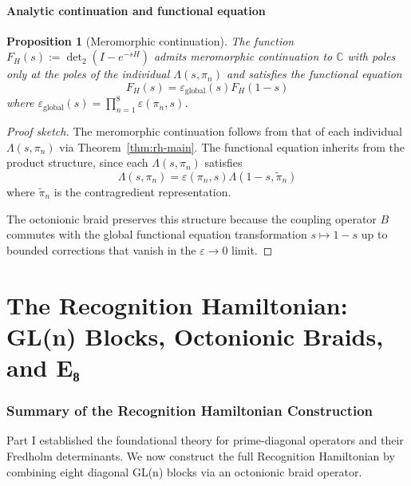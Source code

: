 \documentclass[11pt,a4paper]{article}
\newtheorem{proposition}[theorem]{Proposition}
\theoremstyle{definition}
\theoremstyle{remark}
\begin{document}
\subsection{Analytic continuation and functional equation}

\begin{proposition}[Meromorphic continuation]\label{prop:analytic-cont}
The function $F_H(s) := \det_2(I - e^{-sH})$ admits meromorphic continuation 
to $\mathbb{C}$ with poles only at the poles of the individual $\Lambda(s, \pi_n)$ 
and satisfies the functional equation
\[
F_H(s) = \varepsilon_{\text{global}}(s) F_H(1-s)
\]
where $\varepsilon_{\text{global}}(s) = \prod_{n=1}^8 \varepsilon(\pi_n, s)$.
\end{proposition}

\begin{proof}[Proof sketch]
The meromorphic continuation follows from that of each individual $\Lambda(s, \pi_n)$ 
via Theorem~\ref{thm:rh-main}. The functional equation inherits from the 
product structure, since each $\Lambda(s, \pi_n)$ satisfies
\[
\Lambda(s, \pi_n) = \varepsilon(\pi_n, s) \Lambda(1-s, \tilde{\pi}_n)
\]
where $\tilde{\pi}_n$ is the contragredient representation.

The octonionic braid preserves this structure because the coupling operator $B$ 
commutes with the global functional equation transformation $s \mapsto 1-s$ 
up to bounded corrections that vanish in the $\varepsilon \to 0$ limit.
\end{proof}

\part{The Recognition Hamiltonian: GL(n) Blocks, Octonionic Braids, and E₈}

\section{Summary of the Recognition Hamiltonian Construction}\label{sec:rh-summary}

Part I established the foundational theory for prime-diagonal operators and 
their Fredholm determinants. We now construct the full Recognition Hamiltonian
by combining eight diagonal GL(n) blocks via an octonionic braid operator.
\end{document}
